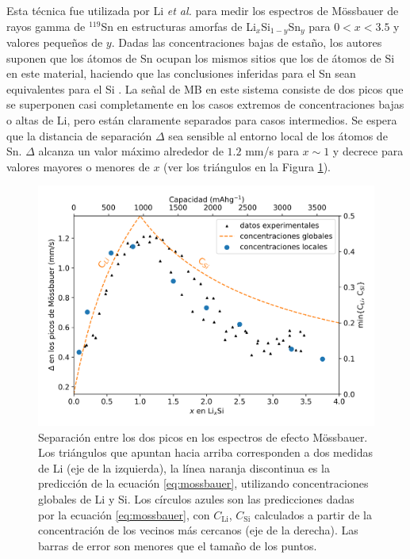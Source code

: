 Esta técnica fue utilizada por Li \textit{et al.} \cite{li2009} para medir los espectros de 
Mössbauer de rayos gamma de $^{119}$Sn en estructuras amorfas de 
Li$_x$Si$_{1-y}$Sn$_y$ para $0 < x < 3.5$ y valores pequeños de $y$. 
Dadas las concentraciones bajas de estaño, los autores suponen que los átomos de Sn
ocupan los mismos sitios que los de átomos de Si en este material, haciendo que 
las conclusiones inferidas para el Sn sean equivalentes para el Si 
\cite{hatchard2005}. La señal de MB en este sistema consiste de dos picos que se superponen casi 
completamente en los casos extremos de concentraciones bajas o altas de Li, 
pero están claramente separados para casos intermedios. Se espera que la distancia de separación
$\Delta$ sea sensible al entorno local de los átomos de Sn. $\Delta$
alcanza un valor máximo alrededor de $1.2$ mm/s para $x \sim 1$ y decrece para 
valores mayores o menores de $x$ (ver los triángulos en la Figura \ref{fig:mossbauer}).
\begin{figure}[h!]
    \centering
    \includegraphics[width=.7\textwidth]{Silicio/prediccion/resultados/mossbauer/mossbauer.png}
    \caption{Separación entre los dos picos en los espectros de efecto 
    Mössbauer. Los triángulos que apuntan hacia arriba corresponden a dos 
    medidas de Li  \cite{li2009} (eje de la izquierda), la línea naranja discontinua es la 
    predicción de la ecuación \ref{eq:mossbauer}, utilizando concentraciones 
    globales de Li y Si. Los círculos azules son las predicciones dadas 
    por la ecuación \ref{eq:mossbauer}, con $C_{\text{Li}}$, $C_{\text{Si}}$ 
    calculados a partir de la concentración de los vecinos más cercanos (eje de 
    la derecha). Las barras de error son menores que el tamaño de los puntos.}
    \label{fig:mossbauer}
\end{figure}
